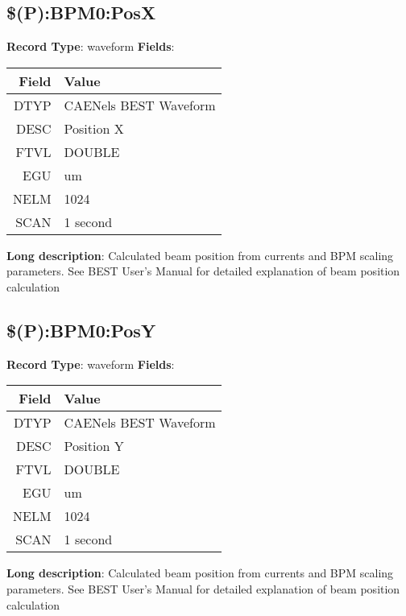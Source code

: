 \subsection{\$(P):BPM0:PosX}
\textbf{Record Type}: waveform \newline \newline 
\textbf{Fields}: \newline 
\begin{tabularx}{0.7\linewidth}{|r|X|}
\hline Field & Value \\
\hline
\hline
DTYP & CAENels BEST Waveform\\
\hline
DESC & Position X\\
\hline
FTVL & DOUBLE\\
\hline
EGU & um\\
\hline
NELM & 1024\\
\hline
SCAN & 1 second\\
\hline
\end{tabularx}
\newline \newline \newline
\textbf{Long description}: \newline 
 Calculated beam position from currents and BPM scaling parameters. See BEST User's Manual for detailed explanation of beam position calculation
\newline \newline


\subsection{\$(P):BPM0:PosY}
\textbf{Record Type}: waveform \newline \newline 
\textbf{Fields}: \newline 
\begin{tabularx}{0.7\linewidth}{|r|X|}
\hline Field & Value \\
\hline
\hline
DTYP & CAENels BEST Waveform\\
\hline
DESC & Position Y\\
\hline
FTVL & DOUBLE\\
\hline
EGU & um\\
\hline
NELM & 1024\\
\hline
SCAN & 1 second\\
\hline
\end{tabularx}
\newline \newline \newline
\textbf{Long description}: \newline 
 Calculated beam position from currents and BPM scaling parameters. See BEST User's Manual for detailed explanation of beam position calculation
\newline \newline


